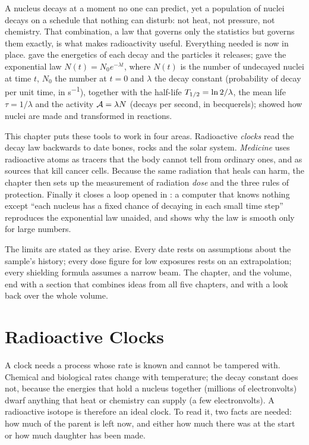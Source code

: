 
A nucleus decays at a moment no one can predict, yet a population of nuclei decays on a schedule that
nothing can disturb: not heat, not pressure, not chemistry. That combination, a law that governs only the
statistics but governs them exactly, is what makes radioactivity useful. Everything needed is now in
place.  gave the energetics of each decay and the particles it releases;
 gave the exponential law $N(t)=N_0e^{-\lambda t}$, where $N(t)$ is the number of
undecayed nuclei at time $t$, $N_0$ the number at $t=0$ and $\lambda$ the decay constant (probability of
decay per unit time, in \si{s^{-1}}), together with the half-life $T_{1/2}=\ln2/\lambda$, the mean life
$\tau=1/\lambda$ and the activity $\mathcal{A}=\lambda N$ (decays per second, in becquerels);
 showed how nuclei are made and transformed in reactions.

This chapter puts these tools to work in four areas. Radioactive \emph{clocks} read the decay law
backwards to date bones, rocks and the solar system. \emph{Medicine} uses radioactive atoms as tracers
that the body cannot tell from ordinary ones, and as sources that kill cancer cells. Because the same
radiation that heals can harm, the chapter then sets up the measurement of radiation \emph{dose} and the
three rules of protection. Finally it closes a loop opened in : a computer that knows
nothing except ``each nucleus has a fixed chance of decaying in each small time step'' reproduces the
exponential law unaided, and shows why the law is smooth only for large numbers.

The limits are stated as they arise. Every date rests on assumptions about the sample's history; every
dose figure for low exposures rests on an extrapolation; every shielding formula assumes a narrow beam.
The chapter, and the volume, end with a section that combines ideas from all five chapters, and with a
look back over the whole volume.

\section{Radioactive Clocks}\label{sec:nucapp-clocks}

A clock needs a process whose rate is known and cannot be tampered with. Chemical and biological rates
change with temperature; the decay constant does not, because the energies that hold a nucleus together
(millions of electronvolts) dwarf anything that heat or chemistry can supply (a few electronvolts). A
radioactive isotope is therefore an ideal clock. To read it, two facts are needed: how much of the
parent is left now, and either how much there was at the start or how much daughter has been made.


